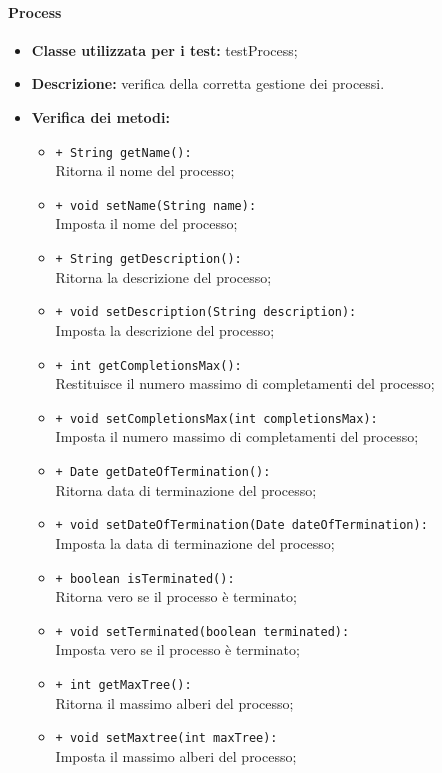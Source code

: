\paragraph{Process}
\begin{flushleft}
\begin{itemize}
\item \textbf{Classe utilizzata per i test:} testProcess;
\item \textbf{Descrizione:} verifica della corretta gestione dei processi.
\item \textbf{Verifica dei metodi:}
\begin{sloppypar}
\begin{itemize}
\item \texttt{+ String getName():}\\ Ritorna il nome del processo;
\item \texttt{+ void setName(String name):}\\ Imposta il nome del processo;
\item \texttt{+ String getDescription():}\\ Ritorna la descrizione del processo;
\item \texttt{+ void setDescription(String description):}\\ Imposta la descrizione del processo;
\item \texttt{+ int getCompletionsMax():}\\ Restituisce il numero massimo di completamenti del processo;
\item \texttt{+ void setCompletionsMax(int completionsMax):}\\ Imposta il numero massimo di completamenti del processo;
\item \texttt{+ Date getDateOfTermination():}\\ Ritorna data di terminazione del processo;
\item \texttt{+ void setDateOfTermination(Date dateOfTermination):}\\ Imposta la data di terminazione del processo;
\item \texttt{+ boolean isTerminated():}\\ Ritorna vero se il processo è terminato;
\item \texttt{+ void setTerminated(boolean terminated):}\\ Imposta vero se il processo è terminato;
\item \texttt{+ int getMaxTree():}\\ Ritorna il massimo alberi del processo;
\item \texttt{+ void setMaxtree(int maxTree):}\\ Imposta il massimo alberi del processo;

\end{itemize}
\end{sloppypar}
\end{itemize}
\end{flushleft}
